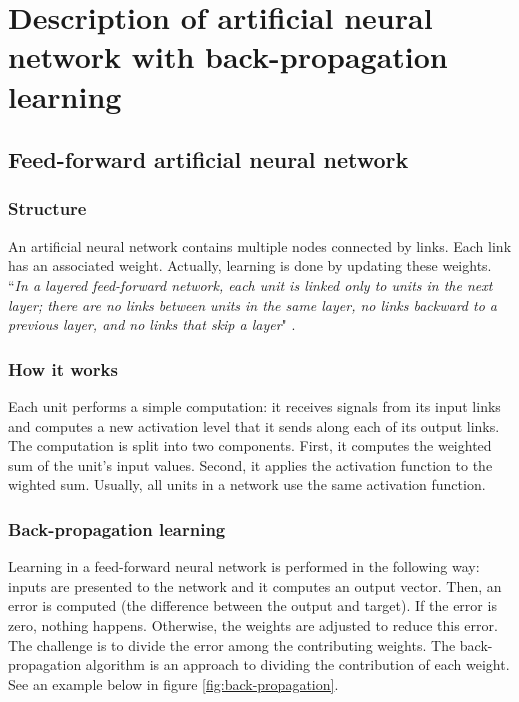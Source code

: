 \documentclass[12pt]{report}
\begin{document}
\section{Description of artificial neural network with back-propagation learning}
 \subsection{Feed-forward artificial neural network}
 \subsubsection{Structure}
 An artificial neural network contains multiple nodes connected by links. Each link has an associated weight. Actually, learning is done by updating these weights. “\textit{In a layered feed-forward network, each unit is linked only to units in the next layer; there are no links between units in the same layer, no links backward to a previous layer, and no links that skip a layer}"  \cite{artificialIntelligenceModernApproach}.
 
 \subsubsection{How it works}
 Each unit performs a simple computation: it receives signals from its input links and computes a new activation level that it sends along each of its output links. The computation is split into two components. First, it computes the weighted sum of the unit's input values. Second, it applies the activation function to the wighted sum.  Usually, all units in a network use the same activation function.
 
 \subsubsection{Back-propagation learning}
 Learning in a feed-forward neural network is performed in the following way: inputs are presented to the network and it computes an output vector. Then, an error is computed  (the difference between the output and target). If the error is zero, nothing happens. Otherwise, the weights are adjusted to  reduce this error. The challenge is to divide the error among the contributing weights. The back-propagation algorithm is an approach to dividing the contribution of each weight. See an example below in figure \ref{fig:back-propagation}.
 
\end{document}
